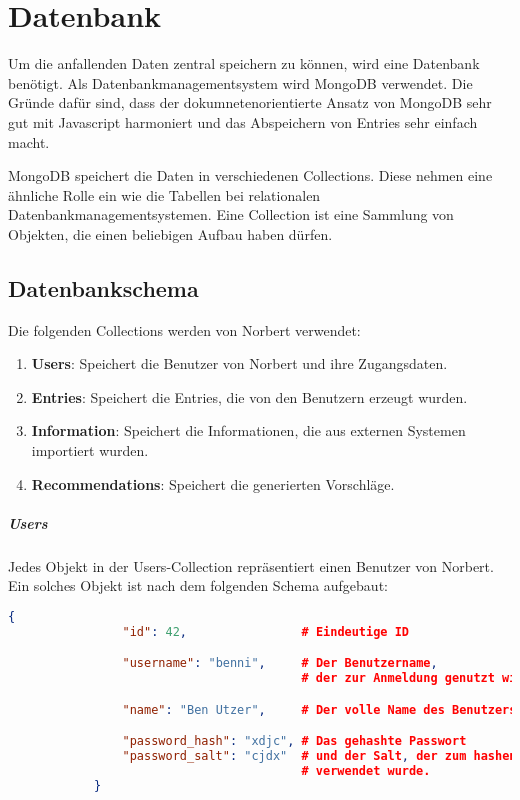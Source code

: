 
\chapter{Datenbank}

Um die anfallenden Daten zentral speichern zu können, wird eine Datenbank benötigt. Als Datenbankmanagementsystem wird MongoDB verwendet. Die Gründe dafür sind, dass der dokumnetenorientierte Ansatz von MongoDB sehr gut mit Javascript harmoniert und das Abspeichern von Entries sehr einfach macht.

MongoDB speichert die Daten in verschiedenen Collections. Diese nehmen eine ähnliche Rolle ein wie die Tabellen bei relationalen Datenbankmanagementsystemen. Eine Collection ist eine Sammlung von Objekten, die einen beliebigen Aufbau haben dürfen.

\section{Datenbankschema} %
\label{sec:datenbankschema}

	Die folgenden Collections werden von Norbert verwendet:

	\begin{enumerate}
		\item \textbf{Users}: Speichert die Benutzer von Norbert und ihre Zugangsdaten.
		\item \textbf{Entries}: Speichert die Entries, die von den Benutzern erzeugt wurden.
		\item \textbf{Information}: Speichert die Informationen, die aus externen Systemen importiert wurden.
		\item \textbf{Recommendations}: Speichert die generierten Vorschläge.
	\end{enumerate}

	\paragraph{Users} %
	\label{par:users}

		Jedes Objekt in der Users-Collection repräsentiert einen Benutzer von Norbert. Ein solches Objekt ist nach dem folgenden Schema aufgebaut:

		\begin{lstlisting}[language=JSON]
			{
				"id": 42,                # Eindeutige ID

				"username": "benni",     # Der Benutzername, 
				                         # der zur Anmeldung genutzt wird.

				"name": "Ben Utzer",     # Der volle Name des Benutzers

				"password_hash": "xdjc", # Das gehashte Passwort
				"password_salt": "cjdx"  # und der Salt, der zum hashen des Passworts 
				                         # verwendet wurde.
			}
		\end{lstlisting}
